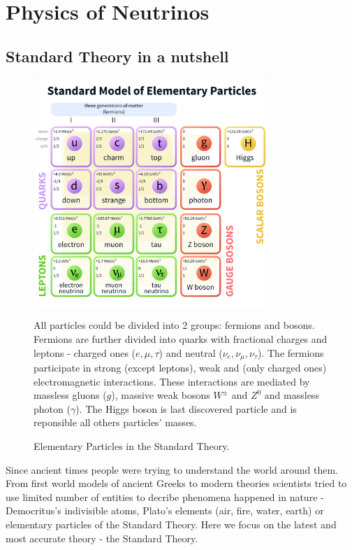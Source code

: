 \chapter{Physics of Neutrinos}
\label{neutrino_physics_chapter}

\section{Standard Theory in a nutshell}
\begin{figure}
\includegraphics[width=0.8\textwidth]{figures/Standard_Model_of_Elementary_Particles.png}
\centering
\caption{Elementary Particles in the Standard Theory.} 
All particles could be divided into 2 groups: fermions and bosons. Fermions are 
further divided into quarks with fractional charges and leptons - charged ones ($e, \mu, \tau$)
and neutral ($\nu_e, \nu_\mu, \nu_{\tau}$). The fermions participate in strong (except leptons), 
weak and (only charged ones) electromagnetic interactions. These interactions are 
mediated by massless gluons ($g$), massive weak bosons $W^{\pm}$ and $Z^0$ and massless
photon ($\gamma$). The Higgs boson is last discovered particle and is reponsible all others 
particles' masses.
\end{figure}
Since ancient times people were trying to understand the world around them. From 
first world models of ancient Greeks to modern theories scientists tried to use 
limited number of entities to decribe phenomena happened in nature - Democritus's 
indivisible atoms, Plato's elements (air, fire, water, earth) or elementary particles 
of the Standard Theory. Here we focus on the latest and most accurate theory - the
Standard Theory.

